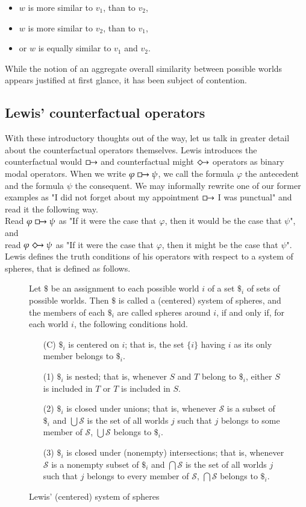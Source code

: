 \documentclass[a4paper,american]{paper}
\theoremstyle{definition}\newtheorem{definition}{Definition}
\begin{document}
\begin{itemize}
\item $w$ is more similar to $v_1$, than to $v_2$,
\item $w$ is more similar to $v_2$, than to $v_1$,
\item or $w$ is equally similar to $v_1$ and $v_2$.
\end{itemize}
While the notion of an aggregate overall similarity between possible worlds appears justified at first glance, it has been subject of contention. \cite{morreau_overall_similarity_2010}
\subsection{Lewis' counterfactual operators}
With these introductory thoughts out of the way, let us talk in greater detail about the counterfactual operators themselves. Lewis introduces the counterfactual would $\boxright$ and counterfactual might $\Diamondright$ operators as binary modal operators. \cite{lewis_counterfactuals_1973} When we write $\varphi\boxright\psi$, we call the formula $\varphi$ the antecedent and the formula $\psi$ the consequent. We may informally rewrite one of our former examples as "I did not forget about my appointment $\boxright$ I was punctual" and read it the following way.\\
Read $\varphi\boxright\psi$ as "If it were the case that $\varphi$, then it would be the case that $\psi$", and\\
read $\varphi\Diamondright\psi$ as "If it were the case that $\varphi$, then it might be the case that $\psi$".\\
Lewis defines the truth conditions of his operators with respect to a system of spheres, that is defined as follows.
\begin{figure}[H]
	Let $\$$ be an assignment to each possible world $i$ of a set $\$_i$ of sets of possible worlds. Then $\$$ is called a (centered) system of spheres, and the members of each $\$_i$ are called spheres around $i$, if and only if, for each world $i$, the following conditions hold.
	\begin{itemize}
	\item[(C)] $\$_i$ is centered on $i$; that is, the set $\{i\}$ having $i$ as its only member belongs to $\$_i$.
	\item[(1)] $\$_i$ is nested; that is, whenever $S$ and $T$ belong to $\$_i$, either $S$ is included in $T$ or $T$ is included in $S$.
	\item[(2)] $\$_i$ is closed under unions; that is, whenever $\mathscr{S}$ is a subset of $\$_i$ and $\bigcup\mathscr{S}$ is the set of all worlds $j$ such that $j$ belongs to some member of $\mathscr{S}$, $\bigcup\mathscr{S}$ belongs to $\$_i$.
	\item[(3)] $\$_i$ is closed under (nonempty) intersections; that is, whenever $\mathscr{S}$ is a nonempty subset of $\$_i$ and $\bigcap\mathscr{S}$ is the set of all worlds $j$ such that $j$ belongs to every member of $\mathscr{S}$, $\bigcap\mathscr{S}$ belongs to $\$_i$.
	\end{itemize}
	\caption{Lewis' (centered) system of spheres}
	\label{fig:system_of_spheres}
\end{figure}
\end{document}
